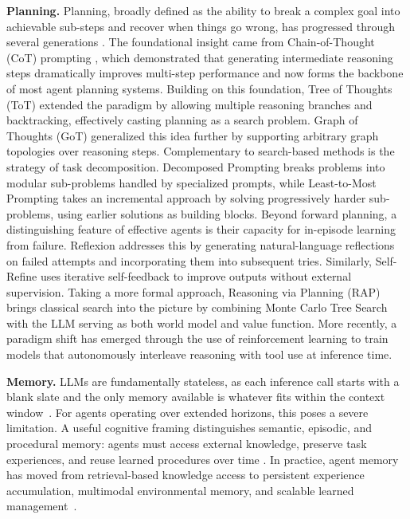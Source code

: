 \textbf{Planning.} Planning, broadly defined as the ability to break a complex goal into achievable sub-steps and recover when things go wrong, has progressed through several generations \cite{li2025towards,li2025benchmarking, kuang2026atomic, guo2026evoconfig}. The foundational insight came from Chain-of-Thought (CoT) prompting \cite{wei2022chain}, which demonstrated that generating intermediate reasoning steps dramatically improves multi-step performance and now forms the backbone of most agent planning systems. Building on this foundation, Tree of Thoughts (ToT) \cite{yao2023tree} extended the paradigm by allowing multiple reasoning branches and backtracking, effectively casting planning as a search problem. Graph of Thoughts (GoT) \cite{besta2024graph} generalized this idea further by supporting arbitrary graph topologies over reasoning steps. Complementary to search-based methods is the strategy of task decomposition. Decomposed Prompting \cite{khot2022decomposed} breaks problems into modular sub-problems handled by specialized prompts, while Least-to-Most Prompting \cite{zhou2022least} takes an incremental approach by solving progressively harder sub-problems, using earlier solutions as building blocks. Beyond forward planning, a distinguishing feature of effective agents is their capacity for in-episode learning from failure. Reflexion \cite{shinn2023reflexion} addresses this by generating natural-language reflections on failed attempts and incorporating them into subsequent tries. Similarly, Self-Refine \cite{madaan2023selfrefine} uses iterative self-feedback to improve outputs without external supervision. Taking a more formal approach, Reasoning via Planning (RAP) \cite{hao2023reasoning} brings classical search into the picture by combining Monte Carlo Tree Search with the LLM serving as both world model and value function. More recently, a paradigm shift has emerged through the use of reinforcement learning to train models that autonomously interleave reasoning with tool use at inference time.

\textbf{Memory.} LLMs are fundamentally stateless, as each inference call starts with a blank slate and the only memory available is whatever fits within the context window~\cite{packer2023memgpt,wang2023augmenting,shan2025cognitive,fang2025lightmem,du2026memory}. For agents operating over extended horizons, this poses a severe limitation. A useful cognitive framing distinguishes semantic, episodic, and procedural memory: agents must access external knowledge, preserve task experiences, and reuse learned procedures over time \cite{zhang2025survey,pink2025position}. In practice, agent memory has moved from retrieval-based knowledge access to persistent experience accumulation, multimodal environmental memory, and scalable learned management~\citep{li2026world,zhu2025evolutionary,qin2025aptbench,jiang2026sok,adamenko2025swe}.

